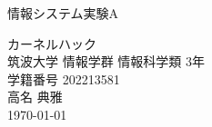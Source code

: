 \begin{titlepage}

\begin{flushright}
{\large
情報システム実験A
}
\end{flushright}
\begin{center}
\vspace*{200truept}
{\Huge カーネルハック}\\
\vspace{300truept}
{\LARGE 筑波大学 情報学群 情報科学類 3年}\\
\vspace{10truept}
{\LARGE 学籍番号 202213581}\\
\vspace{40truept}
{\huge 高名 典雅}\\
\vspace{40truept}
{\huge \today}\\
\end{center}

\end{titlepage}
